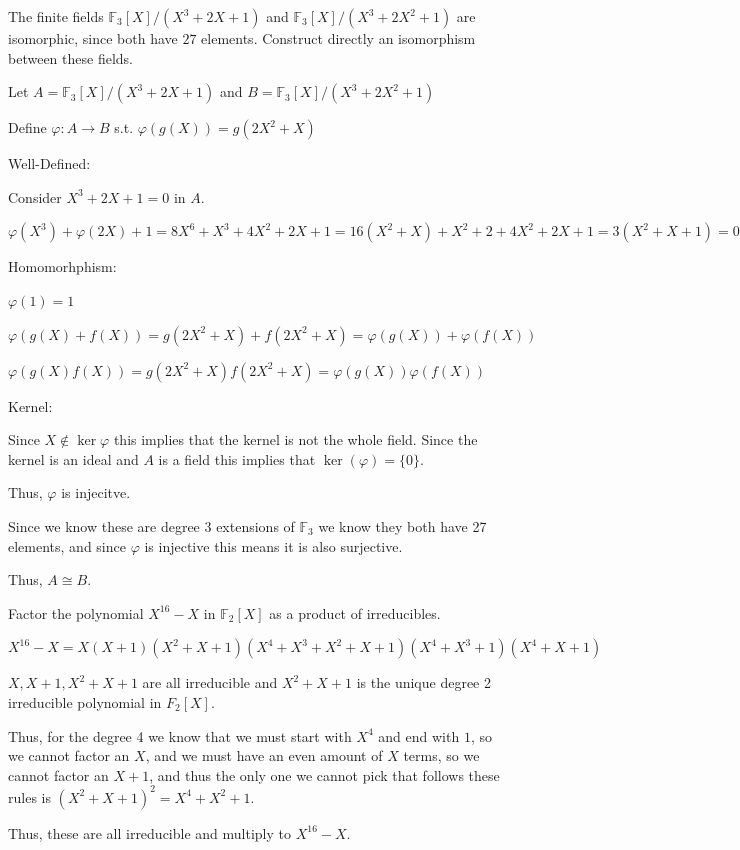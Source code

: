 \documentclass[12pt, letterpaper]{article}
\newcommand{\F}{\mathbb{F}}
\begin{document}
\color{\TextColor}
\pagecolor{\colormode}
\setlength{\parindent}{0pt}
\pagestyle{fancy}
\fancyhf{}
\fancyhead[ROE]{\color{\TextColor}\thepage}

\begin{problem}{}
    The finite fields $\F_3 [X]/ (X^3 + 2X +1)$ and  $\F_3 [X]/ (X^3 + 2X^2 +1)$
are isomorphic, since both have $27$ elements.  Construct directly an isomorphism between these fields. 
\end{problem}
\begin{problemproof}
    Let $A=\F_3 [X]/ (X^3 + 2X +1)$ and $B=\F_3 [X]/ (X^3 + 2X^2 +1)$

    Define $\varphi : A \to B$ s.t. $\varphi(g(X))=g(2X^2+X)$

    Well-Defined:

    Consider $X^3+2X+1=0$ in $A$.

    $\varphi(X^3)+\varphi(2X)+1=8X^6+X^3+4X^2+2X+1=16(X^2+X)+X^2+2+4X^2+2X+1=3(X^2+X+1)=0$

    Homomorhphism:

    $\varphi(1)=1$

    $\varphi(g(X)+f(X))=g(2X^2+X)+f(2X^2+X)=\varphi(g(X)) + \varphi(f(X))$

    $\varphi(g(X)f(X))=g(2X^2+X)f(2X^2+X)=\varphi(g(X))\varphi(f(X))$

    Kernel: 

    Since $X \notin \ker{\varphi}$ this implies that the kernel is not the whole field. Since the kernel is an ideal and $A$ is a field this implies that $\ker(\varphi)=\{0\}$.

    Thus, $\varphi$ is injecitve.

    Since we know these are degree 3 extensions of $\F_3$ we know they both have 27 elements, and since $\varphi$ is injective this means it is also surjective.

    Thus, $A \cong B$.
\end{problemproof}

\begin{problem}{}
    Factor the polynomial $X^{16}-X$ in $\F_2 [X]$ as a product of irreducibles.
\end{problem}
\begin{problemproof}
    $X^{16}-X=X(X+1)(X^2+X+1)(X^4+X^3+X^2+X+1)(X^4+X^3+1)(X^4+X+1)$

    $X,X+1,X^2+X+1$ are all irreducible and $X^2+X+1$ is the unique degree 2 irreducible polynomial in $F_2[X]$.

    Thus, for the degree 4 we know that we must start with $X^4$ and end with $1$, so we cannot factor an $X$, and we must have an even amount of $X$ terms, so we cannot factor an $X+1$, and thus the only one we cannot pick that follows these rules is $(X^2+X+1)^2=X^4+X^2+1$.

    Thus, these are all irreducible and multiply to $X^16-X$.
\end{problemproof}
\end{document}
